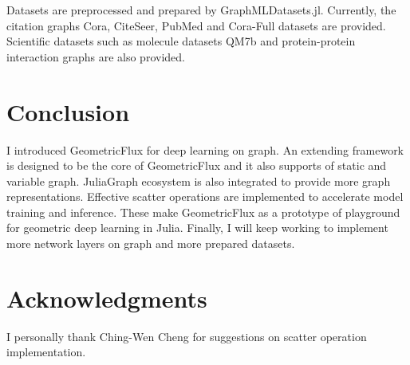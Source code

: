 \documentclass{juliacon}
\begin{document}
Datasets are preprocessed and prepared by GraphMLDatasets.jl. Currently, the citation graphs
Cora, CiteSeer, PubMed and Cora-Full datasets \cite{sen2008,bojchevski2018deep} are
provided. Scientific datasets such as molecule datasets QM7b \cite{montavon2013} and
protein-protein interaction graphs \cite{hamilton2017} are also provided.

\section{Conclusion}

I introduced GeometricFlux for deep learning on graph. An extending framework is designed
to be the core of GeometricFlux and it also supports of static and variable graph.
JuliaGraph ecosystem is also integrated to provide more graph representations.
Effective scatter operations are implemented to accelerate model training and inference.
These make GeometricFlux as a prototype of playground for geometric deep learning in Julia.
Finally, I will keep working to implement more network layers on graph and more prepared
datasets.

\section{Acknowledgments}

I personally thank Ching-Wen Cheng for suggestions on scatter operation implementation.


\end{document}
